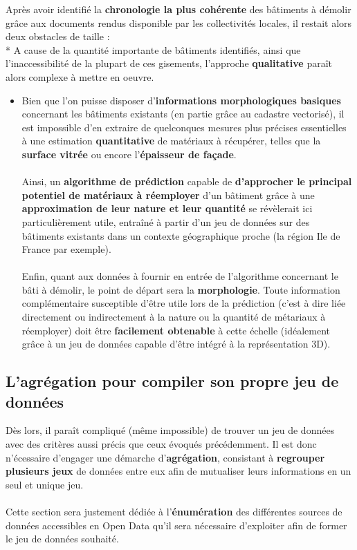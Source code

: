 \documentclass[
  11pt,
  french,
]{article}
\providecommand{\tightlist}{%
  \setlength{\itemsep}{0pt}\setlength{\parskip}{0pt}}
\begin{document}
Après avoir identifié la \textbf{chronologie la plus cohérente} des
bâtiments à démolir grâce aux documents rendus disponible par les
collectivités locales, il restait alors deux obstacles de taille :\\
* A cause de la quantité importante de bâtiments identifiés, ainsi que
l'inaccessibilité de la plupart de ces gisements, l'approche
\textbf{qualitative} paraît alors complexe à mettre en oeuvre.

\begin{itemize}
\tightlist
\item
  Bien que l'on puisse disposer d'\textbf{informations morphologiques
  basiques} concernant les bâtiments existants (en partie grâce au
  cadastre vectorisé), il est impossible d'en extraire de quelconques
  mesures plus précises essentielles à une estimation
  \textbf{quantitative} de matériaux à récupérer, telles que la
  \textbf{surface vitrée} ou encore l'\textbf{épaisseur de façade}.\\
  ~\\
  Ainsi, un \textbf{algorithme de prédiction} capable de
  \textbf{d'approcher le principal potentiel de matériaux à réemployer}
  d'un bâtiment grâce à une \textbf{approximation de leur nature et leur
  quantité} se révèlerait ici particulièrement utile, entraîné à partir
  d'un jeu de données sur des bâtiments existants dans un contexte
  géographique proche (la région Ile de France par exemple).\\
  ~\\
  Enfin, quant aux données à fournir en entrée de l'algorithme
  concernant le bâti à démolir, le point de départ sera la
  \textbf{morphologie}. Toute information complémentaire susceptible
  d'être utile lors de la prédiction (c'est à dire liée directement ou
  indirectement à la nature ou la quantité de métariaux à réemployer)
  doit être \textbf{facilement obtenable} à cette échelle (idéalement
  grâce à un jeu de données capable d'être intégré à la représentation
  3D).
\end{itemize}

\newpage

\hypertarget{lagruxe9gation-pour-compiler-son-propre-jeu-de-donnuxe9es}{%
\subsection{L'agrégation pour compiler son propre jeu de
données}\label{lagruxe9gation-pour-compiler-son-propre-jeu-de-donnuxe9es}}

Dès lors, il paraît compliqué (même impossible) de trouver un jeu de
données avec des critères aussi précis que ceux évoqués précédemment. Il
est donc n'écessaire d'engager une démarche d'\textbf{agrégation},
consistant à \textbf{regrouper plusieurs jeux} de données entre eux afin
de mutualiser leurs informations en un seul et unique jeu.\\
~\\
Cette section sera justement dédiée à l'\textbf{énumération} des
différentes sources de données accessibles en Open Data qu'il sera
nécessaire d'exploiter afin de former le jeu de données souhaité.
\end{document}
